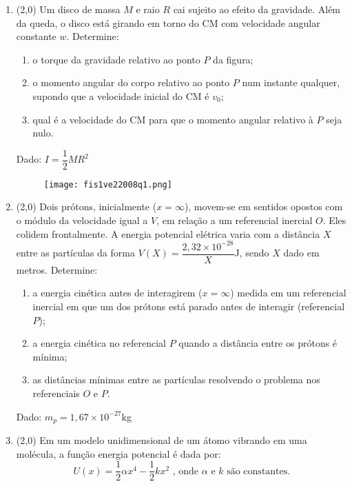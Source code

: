 \documentclass[12pt,a4paper]{article}
\begin{document}
\begin{enumerate}
\item (2,0) Um disco de massa $M$ e raio $R$ cai sujeito ao efeito da gravidade. Além da queda, o disco está girando em torno do CM com velocidade angular constante $w$. Determine:

\begin{enumerate}[label=\alph*)]
\item o torque da gravidade relativo ao ponto $P$ da figura; 
\item o momento angular do corpo relativo ao ponto $P$ num instante qualquer, supondo que a velocidade inicial do CM é $v_0$;
\item qual é a velocidade do CM para que o momento angular relativo à $P$ seja nulo.
\end{enumerate}

Dado: $I=\dfrac{1}{2}MR^2$

\begin{figure}[ht]
\centering
\texttt{[image: fis1ve22008q1.png]}
\end{figure}


\item (2,0) Dois prótons, inicialmente ($x=\infty$), movem-se em sentidos opostos com o módulo da velocidade igual a $V$, em relação a um referencial inercial $O$. Eles 
colidem frontalmente. A energia potencial elétrica varia com a distância $X$ entre as partículas da forma $V(X)=\dfrac{2,32\times 10^{-28}}{X}$J, sendo $X$ dado em metros. Determine:


\begin{enumerate}[label=\alph*)]
\item a energia cinética antes de interagirem ($x=\infty$) medida em um referencial inercial em que um dos prótons está parado antes de interagir (referencial $P$);
\item a energia cinética no referencial $P$ quando a distância entre os prótons é mínima;
\item as distâncias mínimas entre as partículas resolvendo o problema nos referenciais $O$ e $P$.
\end{enumerate}

Dado: $m_p=1,67\times 10^{-27}$kg

\item (2,0) Em um modelo unidimensional de um átomo vibrando em uma molécula, a função energia potencial é dada por:
$$U(x)=\dfrac{1}{2}\alpha x^4-\dfrac{1}{2}kx^2\textrm{ , onde } \alpha \textrm{ e } k \textrm{ são constantes.}$$


\end{enumerate}
\end{document}
